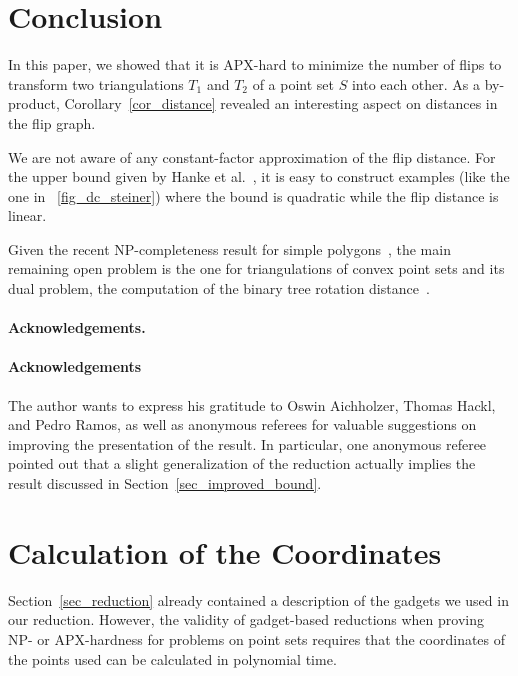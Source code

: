 \documentclass[11pt,a4paper]{article}
\begin{document}
\section{Conclusion}
In this paper, we showed that it is APX-hard to minimize the number of flips to transform two triangulations $T_1$ and $T_2$ of a point set $S$ into each other.
As a by-product, Corollary~\ref{cor_distance} revealed an interesting aspect on distances in the flip graph.

We are not aware of any constant-factor approximation of the flip distance.
For the upper bound given by Hanke et al.~\cite{edge_flipping_distance}, it is easy to construct examples (like the one in \figurename~\ref{fig_dc_steiner}) where the bound is quadratic while the flip distance is linear.

Given the recent NP-completeness result for simple polygons~\cite{poly_hard}, the main remaining open problem is the one for triangulations of convex point sets and its dual problem, the computation of the binary tree rotation distance~\cite{sleator}.





\ifarxiv
\paragraph{Acknowledgements.}
\else
\paragraph{Acknowledgements}
\fi
The author wants to express his gratitude to Oswin Aichholzer, Thomas Hackl, and Pedro Ramos, as well as anonymous referees for valuable suggestions on improving the presentation of the result.
In particular, one anonymous referee pointed out that a slight generalization of the reduction actually implies the result discussed in Section~\ref{sec_improved_bound}.
\appendix

\newcommand{\Q}{\ensuremath{\mathbb{Q}}}

\section{Calculation of the Coordinates}\label{apx_coordinates}
Section~\ref{sec_reduction} already contained a description of the gadgets we used in our reduction.
However, the validity of gadget-based reductions when proving NP- or APX-hardness for problems on point sets requires that the coordinates of the points used can be calculated in polynomial time.
\end{document}
